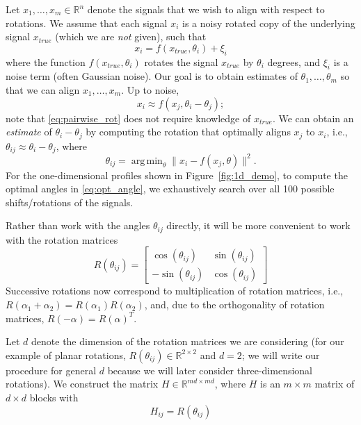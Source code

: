 \documentclass{pnastwo}
\DeclareMathOperator*{\argmin}{arg\,min}
\begin{document}
\begin{article}
\begin{materials}
Let $x_1, \dots, x_m \in \mathbb{R}^n$ denote the signals that we wish to align with respect to rotations.
%
We assume that each signal $x_i$ is a noisy rotated copy of the underlying signal $x_{true}$ (which we are {\em not} given), such that 
\begin{equation}
x_i = f(x_{true}, \theta_i) + \xi_i
\end{equation}
where the function $f(x_{true}, \theta_i)$ rotates the signal $x_{true}$ by $\theta_i$ degrees, and $\xi_i$ is a noise term (often Gaussian noise). 
%
Our goal is to obtain estimates of $\theta_1, \dots, \theta_m$ so that we can align $x_1, \dots, x_m$. 
%
Up to noise, 
\begin{equation} \label{eq:pairwise_rot}
x_i \approx f(x_j, \theta_i - \theta_j) ;
\end{equation}
 note that \eqref{eq:pairwise_rot} does not require knowledge of $x_{true}$.
%
We can obtain an {\em estimate} of $\theta_i - \theta_j$ by computing the rotation that optimally aligns $x_j$ to $x_i$, 
i.e., $\theta_{ij} \approx \theta_i - \theta_j$, where
%
\begin{equation} \label{eq:opt_angle}
\theta_{ij} = \argmin_{\theta} \|x_i - f(x_j, \theta)\|^2.
\end{equation}
%
For the one-dimensional profiles shown in Figure~\ref{fig:1d_demo}, to compute the optimal angles in \eqref{eq:opt_angle}, we exhaustively search over all 100 possible shifts/rotations of the signals. 

Rather than work with the angles $\theta_{ij}$ directly, it will be more convenient to work with the rotation matrices 
\begin{equation} \label{eq:R_theta}
R(\theta_{ij}) = \begin{bmatrix}
\cos(\theta_{ij}) & \sin(\theta_{ij}) \\
-\sin(\theta_{ij}) & \cos(\theta_{ij})
\end{bmatrix}
\end{equation}
%
Successive rotations now correspond to multiplication of rotation matrices, i.e., 
$R(\alpha_1 + \alpha_2) = R(\alpha_1) R(\alpha_2)$,
and, due to the orthogonality of rotation matrices, $R(-\alpha) = R(\alpha)^T$.

Let $d$ denote the dimension of the rotation matrices we are considering (for our example of planar rotations, $R(\theta_{ij}) \in \mathbb{R}^{2 \times 2}$ and $d=2$; we will write our procedure for general $d$ because we will later consider three-dimensional rotations).
%
We construct the matrix $H \in \mathbb{R}^{md \times md}$, where $H$ is an $m \times m$ matrix of $d \times d$ blocks with
\begin{equation} \label{eq:H_to_R}
H_{ij} = R(\theta_{ij})
\end{equation}
%


\end{materials}
\end{article}
\end{document}
